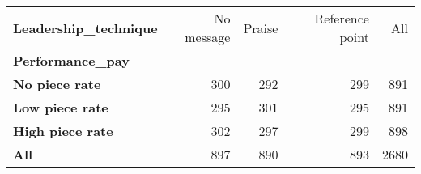 \begin{tabular}{lrrrr}
\toprule
\textbf{Leadership\_technique} &  No message &  Praise &  Reference point &   All \\
\textbf{Performance\_pay} &             &         &                  &       \\
\midrule
\textbf{No piece rate  } &         300 &     292 &              299 &   891 \\
\textbf{Low piece rate } &         295 &     301 &              295 &   891 \\
\textbf{High piece rate} &         302 &     297 &              299 &   898 \\
\textbf{All            } &         897 &     890 &              893 &  2680 \\
\bottomrule
\end{tabular}
